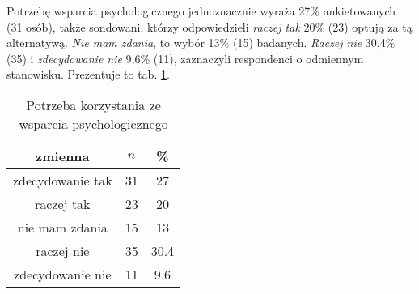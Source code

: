 

 Potrzebę wsparcia psychologicznego jednoznacznie wyraża 27\% ankietowanych (31 osób), także sondowani, którzy odpowiedzieli \textit{raczej tak} 20\% (23) optują za tą alternatywą. \textit{Nie mam zdania}, to wybór 13\% (15) badanych. \textit{Raczej nie} 30,4\% (35) i \textit{zdecydowanie nie} 9,6\% (11), zaznaczyli respondenci o odmiennym stanowisku. Prezentuje to tab. \ref{tab:Q22}.
\begin{table}[H]
\caption{Potrzeba korzystania ze wsparcia psychologicznego}
\centering
\begin{tabular}{ | c | c | c |}
\hline
zmienna & $n$ & \% \\
\hline
zdecydowanie tak  &  31  & 27 \\
\hline
raczej tak  &  23  & 20 \\
\hline
nie mam zdania  &  15  & 13 \\
\hline
raczej nie  &  35  & 30.4 \\
\hline
zdecydowanie nie  &  11  & 9.6 \\
\hline
\end{tabular}
\label{tab:Q22}
\end{table}
